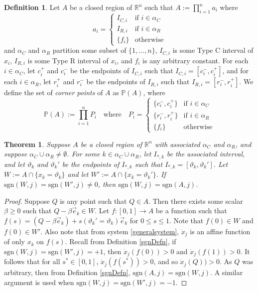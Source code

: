 \documentclass[12pt]{article}
\newtheorem{theorem}{Theorem}[section]
\theoremstyle{definition}
\newtheorem{defn}{Definition}[section]
\theoremstyle{remark}
\newcommand\sgn{\text{sgn}}
\newcommand{\bbR}{\mathbb{R}} %
\newcommand{\bbP}{\mathbb{P}}
\begin{document}
\begin{defn}
Let $A$ be a closed region of $\bbR^n$ such that $A:=\prod^{n}_{i=1}a_i$ where 
\begin{equation*}
a_i =
\begin{cases}
I_{C,i} & \text{if } i\in\alpha_C\\
I_{R,i} & \text{if } i\in\alpha_R\\
\{f_i\} & \text{otherwise}
\end{cases}
\end{equation*}
and $\alpha_C$ and $\alpha_R$ partition some subset of $\{1,\dots,n\}$, $I_{C,i}$ is some Type C interval of $x_i$, $I_{R,i}$ is some Type R interval of $x_i$, and $f_i$ is any arbitrary constant. For each $i\in\alpha_C$, let $c_i^+$ and $c_i^-$ be the endpoints of $I_{C,i}$ such that $I_{C,i}=[c_i^-,c_i^+]$, and for each $i\in\alpha_R$, let $r_i^+$ and $r_i^-$ be the endpoints of $I_{R,i}$ such that $I_{R,i}=[r_i^-,r_i^+]$. We define the set of \textit{corner points} of $A$ as $\bbP(A)$, where
\begin{equation*}
\bbP(A):=\prod_{i=1}^n P_i \quad \text{where} \quad P_i=\begin{cases}
\{c_i^-,c_i^+\} & \text{if } i\in\alpha_C \\
\{r_i^-,r_i^+\} & \text{if } i\in\alpha_R \\
\{f_i\} & \text{otherwise}
\end{cases}
\end{equation*}
\end{defn}

\begin{theorem} \label{straightlineproof}
Suppose $A$ be a closed region of $\bbR^n$ with associated $\alpha_C$ and $\alpha_R$, and suppose $\alpha_C \cup \alpha_R \neq \emptyset$. For some $k\in \alpha_C \cup \alpha_R$, let $I_{*,k}$ be the associated interval, and let $\vartheta_k$ and $\vartheta_k'$ be the endpoints of $I_{*,k}$ such that $I_{*,k}=[\vartheta_k,\vartheta_k']$. Let $W:=A\cap \{x_k=\vartheta_k\}$ and let $W':=A\cap \{x_k=\vartheta_k'\}$. If $\sgn(W,j)=\sgn(W',j)\neq 0$, then $\sgn(W,j)=\sgn(A,j)$.
\end{theorem}

\begin{proof}
Suppose $Q$ is any point such that $Q\in A$. Then there exists some scalar $\beta\geq 0$ such that $Q-\beta \vec e_k\in W$. Let $f:[0,1]\to A$ be a function such that $f(s)=(Q-\beta \vec e_k) + s(\vartheta_k'=\vartheta_k) \vec e_k$ for $0\leq s \leq 1$. Note that $f(0)\in W$ and $f(0)\in W'$. Also note that from system \eqref{generalsystem}, $\dot x_j$ is an affine function of only $x_k$ on $f(s)$. Recall from Definition \ref{sgnDefn}, if $\sgn(W,j)=\sgn(W',j)=+1$, then $\dot x_j (f(0))>0$ and $\dot x_j (f(1))>0$. It follows that for all $s^*\in [0,1]$, $\dot x_j (f(s^*))>0$, and so  $\dot x_j (Q))>0$. As $Q$ was arbitrary, then from Definition \ref{sgnDefn}, $\sgn(A,j)=\sgn(W,j)$. A similar argument is used when $\sgn(W,j)=\sgn(W',j)=-1$.
\end{proof}
\end{document}
